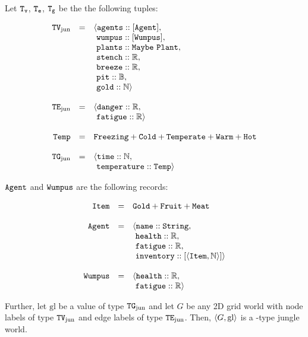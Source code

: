 \begin{definition}[\wjun] Let $\mathtt{T_v}$, $\mathtt{T_e}$, $\mathtt{T_g}$ be the the following tuples:

$$
	\begin{array}{r c l}
		\type{TV_{\mathrm{jun}}} & = & \langle \field{agents} :: [\type{Agent}],\\
		           &   &       \ \field{wumpus} :: [\type{Wumpus}],\\
		           &   & 	   \ \field{plants} :: \type{Maybe\ Plant},\\
		           &   &       \ \field{stench} :: \R,\\
		           &   &       \ \field{breeze} :: \R,\\
		           &   &	   \ \field{pit}    :: \B,\\
		           &   &	   \ \field{gold}   :: \N \rangle 
		\\
		\\
		\type{TE_{\mathrm{jun}}} & = & \langle \field{danger} :: \R,\\
				   &   &       \ \field{fatigue} :: \R \rangle
		\\
		\\
		\type{Temp} & = & \type{Freezing} + \type{Cold} + \type{Temperate} + \type{Warm} + \type{Hot}\\
		\\
		\type{TG_{\mathrm{jun}}} & = & \langle \field{time} :: \N,\\
				   &   &       \ \field{temperature} :: \type{Temp} \rangle
	\end{array}
$$

$\mathtt{Agent}$ and $\mathtt{Wumpus}$ are the following records:

$$
	\begin{array}{r c l}
		\mathtt{Item} & = & \mathtt{Gold + Fruit + Meat}\\
		\\
		\mathtt{Agent} & = & \langle \mathtt{name} :: \mathtt{String},\\ 
					 &   & \ \mathtt{health} :: \mathbb{R},\\
					 &   & \ \mathtt{fatigue} :: \mathbb{R},\\
					 &   & \ \mathtt{inventory} :: [\mathtt{\langle Item, \mathbb{N} \rangle}] \rangle
		\\
		\\
		\mathtt{Wumpus} & = & \langle \mathtt{health} :: \mathbb{R},\\
					  &   & \ \mathtt{fatigue} :: \mathbb{R}\rangle
	\end{array}
$$

Further, let $\mathrm{gl}$ be a value of type $\mathtt{TG}_{\mathrm{jun}}$ and let $G$ be any 2D grid world with node labels of type $\mathtt{TV}_{\mathrm{jun}}$ and edge labels of type $\mathtt{TE}_{\mathrm{jun}}$. Then, $\langle G, \mathrm{gl} \rangle$ is a \wjun-type jungle world.
\end{definition}

